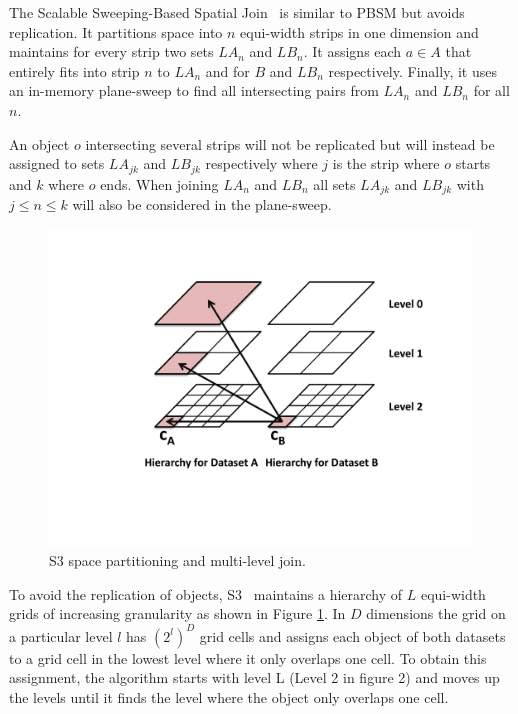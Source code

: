 \documentclass{vldb}
\newcommand{\fref}[1]{Figure \ref{#1}}
\begin{document}
The Scalable Sweeping-Based Spatial Join~\cite{sssj} is similar to PBSM but avoids replication. It partitions space into $n$ equi-width strips in one dimension
and maintains for every strip two sets $LA_n$ and $LB_n$. It assigns each $a \in A$ that entirely fits into strip $n$ to $LA_n$ and for $B$ and $LB_n$
respectively. Finally, it uses an in-memory plane-sweep to find all intersecting pairs from $LA_n$ and $LB_n$ for all $n$.

An object $o$ intersecting several strips will not be replicated but will instead be assigned to sets $LA_{jk}$ and $LB_{jk}$ respectively where $j$ is the
strip where $o$ starts and $k$ where $o$ ends. When joining $LA_n$ and $LB_n$ all sets $LA_{jk}$ and $LB_{jk}$ with $j \le n \le k$ will also be considered in the
plane-sweep.



\begin{figure}[htb]
    \begin{center}
        \includegraphics[width=.8\columnwidth]{figures/SizeSeparation}
\vspace{-3mm}
        \caption{S3 space partitioning and multi-level join.}
        \label{fig:SizeSeparation}
      \end{center}
\vspace{-9mm}
\end{figure}

To avoid the replication of objects, S3~\cite{join:SizeSeparation} maintains a hierarchy of $L$ equi-width grids of increasing granularity as shown in
\fref{fig:SizeSeparation}. In $D$ dimensions the grid on a particular level $l$ has $(2^l)^D$ grid cells and assigns each object of both datasets to a grid cell
in the lowest level where it only overlaps one cell. To obtain this assignment, the algorithm starts with level L (Level 2 in figure 2) and moves up the levels until it finds the
level where the object only overlaps one cell.
\end{document}
